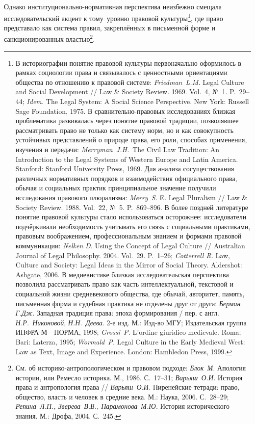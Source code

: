 Однако институционально-нормативная перспектива неизбежно смещала исследовательский акцент к тому~уровню правовой культуры\footnote{В историографии понятие правовой культуры первоначально оформилось в рамках социологии права и связывалось с ценностными ориентациями общества по отношению к правовой системе: \emph{Friedman}\emph{~L.M.} Legal Culture and Social Development // Law \& Society Review. 1969. Vol.~4, №~1. P.~29--44; \emph{Idem.} The Legal System: A Social Science Perspective. New York: Russell Sage Foundation, 1975. В сравнительно-правовых исследованиях близкая проблематика развивалась через понятие правовой традиции, позволявшее рассматривать право не только как систему норм, но и как совокупность устойчивых представлений о природе права, его роли, способах применения, изучения и передачи: \emph{Merryman}\emph{~}\emph{J.H.}~The Civil Law Tradition: An Introduction to the Legal Systems of Western Europe and Latin America. Stanford: Stanford University Press, 1969. Для анализа сосуществования различных нормативных порядков и взаимодействия официального права, обычая и социальных практик принципиальное значение получили исследования правового плюрализма: \emph{Merry}\emph{~S.} E. Legal Pluralism // Law \& Society Review. 1988. Vol.~22, №~5. P.~869--896. В более поздней литературе понятие правовой культуры стало использоваться осторожнее: исследователи подчёркивали необходимость учитывать его связь с социальными практиками, правовым воображением, профессиональным знанием и формами правовой коммуникации: \emph{Nelken}\emph{ D.} Using the Concept of Legal Culture // Australian Journal of Legal Philosophy. 2004. Vol.~29. P.~1--26; \emph{Cotterrell R.} Law, Culture and Society: Legal Ideas in the Mirror of Social Theory. Aldershot: Ashgate, 2006. В медиевистике близкая исследовательская перспектива позволила рассматривать право как часть интеллектуальной, текстовой и социальной жизни средневекового общества, где обычай, авторитет, память, письменная форма и судебная практика не отделены друг от друга: \emph{Берман }\emph{Г.Дж}\emph{. }Западная традиция права: эпоха формирования / пер. с англ. \emph{Н.Р.~Никоновой}, \emph{Н.Н.~Деева}. 2-е изд. М.: Изд-во МГУ; Издательская группа ИНФРА-М---НОРМА, 1998; \emph{Grossi~P}\emph{.} L’ordine giuridico medievale. Roma; Bari: Laterza, 1995; \emph{Wormald~P. }Legal Culture in the Early Medieval West: Law as Text, Image and Experience. London: Hambledon Press, 1999.}, где право представало как система правил, закреплённых в письменной форме и санкционированных властью\footnote{См. об историко-антропологическом и правовом подходе: \emph{Блок~М.} Апология истории, или Ремесло историка. М., 1986. С.~17--31; \emph{Варьяш}\emph{~}\emph{О.И. }История права и антропология права // \emph{Варьяш}\emph{~}\emph{О.И.} Пиренейские тетради: право, общество, власть и человек в средние века. М.: Наука, 2006. С.~28--29; \emph{Репина}\emph{~}\emph{Л.П., Зверева}\emph{~}\emph{В.В., Парамонова~М.Ю. }История исторического знания. М.: Дрофа, 2004. С.~245.}.

